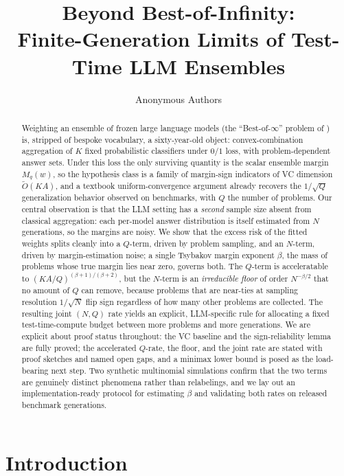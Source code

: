 \documentclass{article} %
\title{Beyond Best-of-Infinity:\\ Finite-Generation Limits of Test-Time LLM Ensembles}
\author{Anonymous Authors}
\begin{document}
\maketitle


\begin{abstract}
Weighting an ensemble of frozen large language models (the ``Best-of-$\infty$'' problem of \citet{komiyama2026best}) is, stripped of bespoke vocabulary, a sixty-year-old object: convex-combination aggregation of $K$ fixed probabilistic classifiers under $0/1$ loss, with problem-dependent answer sets. Under this loss the only surviving quantity is the scalar ensemble margin $M_q(w)$, so the hypothesis class is a family of margin-sign indicators of VC dimension $\tilde O(KA)$, and a textbook uniform-convergence argument already recovers the $1/\sqrt{Q}$ generalization behavior observed on benchmarks, with $Q$ the number of problems. Our central observation is that the LLM setting has a \emph{second} sample size absent from classical aggregation: each per-model answer distribution is itself estimated from $N$ generations, so the margins are noisy. We show that the excess risk of the fitted weights splits cleanly into a $Q$-term, driven by problem sampling, and an $N$-term, driven by margin-estimation noise; a single Tsybakov margin exponent $\beta$, the mass of problems whose true margin lies near zero, governs both. The $Q$-term is acceleratable to $(KA/Q)^{(\beta+1)/(\beta+2)}$, but the $N$-term is an \emph{irreducible floor} of order $N^{-\beta/2}$ that no amount of $Q$ can remove, because problems that are near-ties at sampling resolution $1/\sqrt N$ flip sign regardless of how many other problems are collected. The resulting joint $(N,Q)$ rate yields an explicit, LLM-specific rule for allocating a fixed test-time-compute budget between more problems and more generations. We are explicit about proof status throughout: the VC baseline and the sign-reliability lemma are fully proved; the accelerated $Q$-rate, the floor, and the joint rate are stated with proof sketches and named open gaps, and a minimax lower bound is posed as the load-bearing next step. Two synthetic multinomial simulations confirm that the two terms are genuinely distinct phenomena rather than relabelings, and we lay out an implementation-ready protocol for estimating $\beta$ and validating both rates on released benchmark generations.
\end{abstract}


\section{Introduction}
\label{sec:intro}
\end{document}
